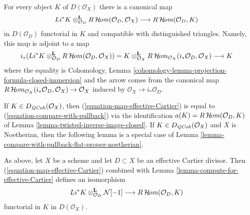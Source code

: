 \noindent
For every object $K$ of $D(\mathcal{O}_X)$ there is a canonical map
\begin{equation}
\label{equation-map-effective-Cartier}
Li^*K
\otimes_{\mathcal{O}_D}^\mathbf{L}
R\mathop{\mathcal{H}\!\mathit{om}}\nolimits(\mathcal{O}_D, \mathcal{O}_X)
\longrightarrow
R\mathop{\mathcal{H}\!\mathit{om}}\nolimits(\mathcal{O}_D, K)
\end{equation}
in $D(\mathcal{O}_D)$ functorial in $K$ and
compatible with distinguished triangles.
Namely, this map is adjoint to a map
$$
i_*(Li^*K \otimes^\mathbf{L}_{\mathcal{O}_D}
R\mathop{\mathcal{H}\!\mathit{om}}\nolimits(\mathcal{O}_D, \mathcal{O}_X)) =
K \otimes^\mathbf{L}_{\mathcal{O}_X}
R\mathop{\mathcal{H}\!\mathit{om}}\nolimits_{\mathcal{O}_X}(i_*\mathcal{O}_D, \mathcal{O}_X)
\longrightarrow K
$$
where the equality is
Cohomology, Lemma \ref{cohomology-lemma-projection-formula-closed-immersion}
and the arrow comes from the canonical map
$R\mathop{\mathcal{H}\!\mathit{om}}\nolimits_{\mathcal{O}_X}(i_*\mathcal{O}_D, \mathcal{O}_X) \to \mathcal{O}_X$
induced by $\mathcal{O}_X \to i_*\mathcal{O}_D$.

\medskip\noindent
If $K \in D_{\mathit{QCoh}}(\mathcal{O}_X)$, then
(\ref{equation-map-effective-Cartier}) is equal to
(\ref{equation-compare-with-pullback}) via the identification
$a(K) = R\mathop{\mathcal{H}\!\mathit{om}}\nolimits(\mathcal{O}_D, K)$ of
Lemma \ref{lemma-twisted-inverse-image-closed}.
If $K \in D_{\mathit{QCoh}}(\mathcal{O}_X)$ and $X$ is Noetherian, then
the following lemma is a special case of
Lemma \ref{lemma-compare-with-pullback-flat-proper-noetherian}.

\begin{lemma}
\label{lemma-sheaf-with-exact-support-effective-Cartier}
As above, let $X$ be a scheme and let $D \subset X$ be an
effective Cartier divisor. Then (\ref{equation-map-effective-Cartier})
combined with Lemma \ref{lemma-compute-for-effective-Cartier}
defines an isomorphism
$$
Li^*K \otimes_{\mathcal{O}_D}^\mathbf{L} \mathcal{N}[-1]
\longrightarrow
R\mathop{\mathcal{H}\!\mathit{om}}\nolimits(\mathcal{O}_D, K)
$$
functorial in $K$ in $D(\mathcal{O}_X)$.
\end{lemma}


